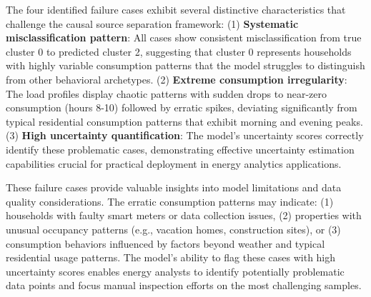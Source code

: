 \documentclass[journal]{IEEEtran}
\begin{document}
The four identified failure cases exhibit several distinctive characteristics that challenge the causal source separation framework: (1) \textbf{Systematic misclassification pattern}: All cases show consistent misclassification from true cluster 0 to predicted cluster 2, suggesting that cluster 0 represents households with highly variable consumption patterns that the model struggles to distinguish from other behavioral archetypes. (2) \textbf{Extreme consumption irregularity}: The load profiles display chaotic patterns with sudden drops to near-zero consumption (hours 8-10) followed by erratic spikes, deviating significantly from typical residential consumption patterns that exhibit morning and evening peaks. (3) \textbf{High uncertainty quantification}: The model's uncertainty scores correctly identify these problematic cases, demonstrating effective uncertainty estimation capabilities crucial for practical deployment in energy analytics applications.

These failure cases provide valuable insights into model limitations and data quality considerations. The erratic consumption patterns may indicate: (1) households with faulty smart meters or data collection issues, (2) properties with unusual occupancy patterns (e.g., vacation homes, construction sites), or (3) consumption behaviors influenced by factors beyond weather and typical residential usage patterns. The model's ability to flag these cases with high uncertainty scores enables energy analysts to identify potentially problematic data points and focus manual inspection efforts on the most challenging samples.
\end{document}
